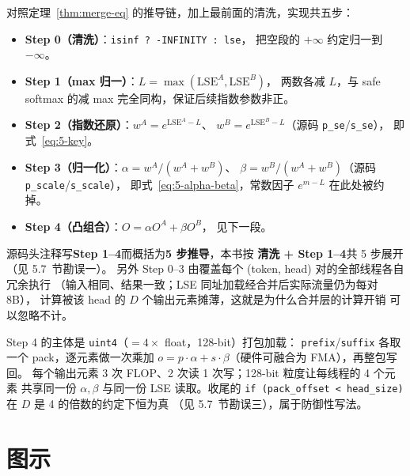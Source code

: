 

对照定理~\ref{thm:merge-eq} 的推导链，加上最前面的清洗，实现共五步：
\begin{itemize}
  \item \textbf{Step 0（清洗）}：\texttt{isinf ? -INFINITY : lse}，
        把空段的 $+\infty$ 约定归一到 $-\infty$。
  \item \textbf{Step 1（max 归一）}：$L = \max(\mathrm{LSE}^{A}, \mathrm{LSE}^{B})$，
        两数各减 $L$，与 safe softmax 的减 max 完全同构，保证后续指数参数非正。
  \item \textbf{Step 2（指数还原）}：$w^{A} = e^{\mathrm{LSE}^{A} - L}$、
        $w^{B} = e^{\mathrm{LSE}^{B} - L}$（源码 \texttt{p\_se}/\texttt{s\_se}），
        即式~\ref{eq:5-key}。
  \item \textbf{Step 3（归一化）}：$\alpha = w^{A}/(w^{A}+w^{B})$、
        $\beta = w^{B}/(w^{A}+w^{B})$（源码 \texttt{p\_scale}/\texttt{s\_scale}），
        即式~\ref{eq:5-alpha-beta}，常数因子 $e^{m-L}$ 在此处被约掉。
  \item \textbf{Step 4（凸组合）}：$O = \alpha O^{A} + \beta O^{B}$，
        见下一段。
\end{itemize}
源码头注释写\textbf{Step 1--4}而概括为\textbf{5 步推导}，本书按
\textbf{清洗 + Step 1--4}共 5 步展开（见 5.7~节勘误一）。
另外 Step 0--3 由覆盖每个 (token, head) 对的全部线程各自冗余执行
（输入相同、结果一致；LSE 同址加载经合并后实际流量仍为每对 8B），
计算被该 head 的 $D$ 个输出元素摊薄，这就是为什么合并层的计算开销
可以忽略不计。



Step 4 的主体是 \texttt{uint4}（$=4 \times$ float，128-bit）打包加载：
\texttt{prefix}/\texttt{suffix} 各取一个 pack，逐元素做一次乘加
$o = p \cdot \alpha + s \cdot \beta$（硬件可融合为 FMA），再整包写回。
每个输出元素 3 次 FLOP、2 次读 1 次写；128-bit 粒度让每线程的 4 个元素
共享同一份 $\alpha, \beta$ 与同一份 LSE 读取。收尾的
\texttt{if \allowbreak{}(pack\_\allowbreak{}offset \allowbreak{}< head\_\allowbreak{}size)} 在 $D$ 是 4 的倍数的约定下恒为真
（见 5.7~节勘误三），属于防御性写法。

\needspace{122mm}

\section{图示}

